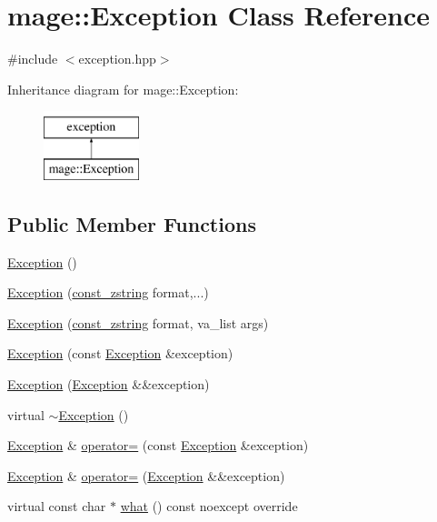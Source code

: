 \hypertarget{classmage_1_1_exception}{}\section{mage\+:\+:Exception Class Reference}
\label{classmage_1_1_exception}


{\ttfamily \#include $<$exception.\+hpp$>$}

Inheritance diagram for mage\+:\+:Exception\+:\begin{figure}[H]
\begin{center}
\leavevmode
\includegraphics[height=2.000000cm]{classmage_1_1_exception}
\end{center}
\end{figure}
\subsection*{Public Member Functions}
\begin{DoxyCompactItemize}
\item 
\mbox{\hyperlink{classmage_1_1_exception_a87fd5f6c5465c01244020afbaebdb9f5}{Exception}} ()
\item 
\mbox{\hyperlink{classmage_1_1_exception_a1fc078e41b69f928fea77ed7ff14d377}{Exception}} (\mbox{\hyperlink{namespacemage_abfd9206dc607ceb5d13ec68bf075a5c0}{const\+\_\+zstring}} format,...)
\item 
\mbox{\hyperlink{classmage_1_1_exception_a11c7f85cb343cb2a894062508ef587f4}{Exception}} (\mbox{\hyperlink{namespacemage_abfd9206dc607ceb5d13ec68bf075a5c0}{const\+\_\+zstring}} format, va\+\_\+list args)
\item 
\mbox{\hyperlink{classmage_1_1_exception_a3f8642ade2ed1168a9853a50ee0e8e98}{Exception}} (const \mbox{\hyperlink{classmage_1_1_exception}{Exception}} \&exception)
\item 
\mbox{\hyperlink{classmage_1_1_exception_a5a745eb8921cb986c822c0f95455314a}{Exception}} (\mbox{\hyperlink{classmage_1_1_exception}{Exception}} \&\&exception)
\item 
virtual \mbox{\hyperlink{classmage_1_1_exception_a088e91ba8dffd31a9d6aa7d4af2ee2c0}{$\sim$\+Exception}} ()
\item 
\mbox{\hyperlink{classmage_1_1_exception}{Exception}} \& \mbox{\hyperlink{classmage_1_1_exception_ab0e7e6b32b07505271a4a88067ab54f4}{operator=}} (const \mbox{\hyperlink{classmage_1_1_exception}{Exception}} \&exception)
\item 
\mbox{\hyperlink{classmage_1_1_exception}{Exception}} \& \mbox{\hyperlink{classmage_1_1_exception_aa9305c6bd8836f56ffa970473533f031}{operator=}} (\mbox{\hyperlink{classmage_1_1_exception}{Exception}} \&\&exception)
\item 
virtual const char $\ast$ \mbox{\hyperlink{classmage_1_1_exception_ae2bd4437e2b7c960f022f7d3bf79baa7}{what}} () const noexcept override
\end{DoxyCompactItemize}
